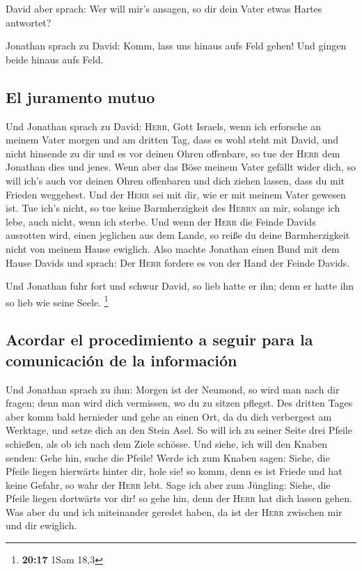  David aber sprach: Wer will mir's ansagen, so dir dein
Vater etwas Hartes antwortet?

 Jonathan sprach zu David: Komm, lass uns hinaus aufs
Feld gehen! Und gingen beide hinaus aufs Feld.

\hypertarget{el-juramento-mutuo}{%
\subsection{El juramento mutuo}\label{el-juramento-mutuo}}

 Und Jonathan sprach zu David: \textsc{Herr}, Gott
Israels, wenn ich erforsche an meinem Vater morgen und am dritten Tag,
dass es wohl steht mit David, und nicht hinsende zu dir und es vor
deinen Ohren offenbare,  so tue der \textsc{Herr} dem
Jonathan dies und jenes. Wenn aber das Böse meinem Vater gefällt wider
dich, so will ich's auch vor deinen Ohren offenbaren und dich ziehen
lassen, dass du mit Frieden weggehest. Und der \textsc{Herr} sei mit
dir, wie er mit meinem Vater gewesen ist.  Tue ich's
nicht, so tue keine Barmherzigkeit des \textsc{Herrn} an mir, solange
ich lebe, auch nicht, wenn ich sterbe.  Und wenn der
\textsc{Herr} die Feinde Davids ausrotten wird, einen jeglichen aus dem
Lande, so reiße du deine Barmherzigkeit nicht von meinem Hause ewiglich.
 Also machte Jonathan einen Bund mit dem Hause Davids und
sprach: Der \textsc{Herr} fordere es von der Hand der Feinde Davids.

 Und Jonathan fuhr fort und schwur David, so lieb hatte
er ihn; denn er hatte ihn so lieb wie seine Seele. \footnote{\textbf{20:17}
  1Sam 18,3}

\hypertarget{acordar-el-procedimiento-a-seguir-para-la-comunicaciuxf3n-de-la-informaciuxf3n}{%
\subsection{Acordar el procedimiento a seguir para la comunicación de la
información}\label{acordar-el-procedimiento-a-seguir-para-la-comunicaciuxf3n-de-la-informaciuxf3n}}

 Und Jonathan sprach zu ihm: Morgen ist der Neumond, so
wird man nach dir fragen; denn man wird dich vermissen, wo du zu sitzen
pflegst.  Des dritten Tages aber komm bald hernieder und
gehe an einen Ort, da du dich verbergest am Werktage, und setze dich an
den Stein Asel.  So will ich zu seiner Seite drei Pfeile
schießen, als ob ich nach dem Ziele schösse.  Und siehe,
ich will den Knaben senden: Gehe hin, suche die Pfeile! Werde ich zum
Knaben sagen: Siehe, die Pfeile liegen hierwärts hinter dir, hole sie!
so komm, denn es ist Friede und hat keine Gefahr, so wahr der
\textsc{Herr} lebt.  Sage ich aber zum Jüngling: Siehe,
die Pfeile liegen dortwärts vor dir! so gehe hin, denn der \textsc{Herr}
hat dich lassen gehen.  Was aber du und ich miteinander
geredet haben, da ist der \textsc{Herr} zwischen mir und dir ewiglich.

